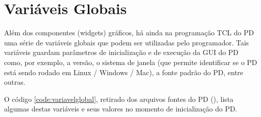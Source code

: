 \section{Variáveis Globais}

Além dos componentes (widgets) gráficos, há ainda na programação TCL do PD uma
série de variáveis globais que podem ser utilizadas pelo programador.
Tais variáveis guardam parâmetros de inicialização e de execução da GUI do PD
como, por exemplo, a versão, o sistema de janela (que permite identificar se
o PD está sendo rodado em Linux / Windows / Mac), a fonte padrão do PD, entre
outras.

O código \ref{code:variavelglobal}, retirado dos arquivos fontes do PD (),
lista algumas destas variáveis e seus valores no momento de inicialização do PD.

